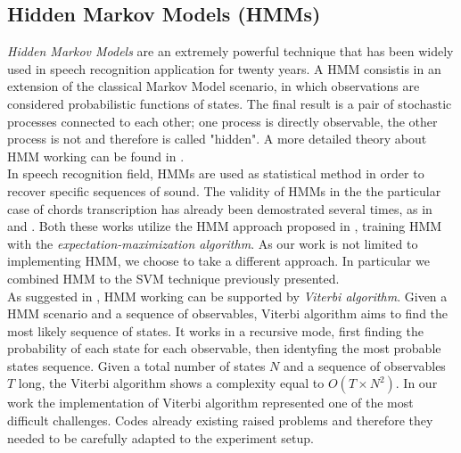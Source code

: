 \subsection{Hidden Markov Models (HMMs)}
\label{subsec:hmm}

\textit{Hidden Markov Models} are an extremely powerful technique that has been widely used in speech recognition application for twenty years. A HMM consistis in an extension of the classical Markov Model scenario, in which observations are considered probabilistic functions of states. The final result is a pair of stochastic processes connected to each other; one process is directly observable, the other process is not and therefore is called "hidden". A more detailed theory about HMM working can be found in \cite{LawrenceHMMtutorial}. \\
%
In speech recognition field, HMMs are used as statistical method in order to recover specific sequences of sound. The validity of HMMs in the the particular case of chords transcription has already been demostrated several times, as in \cite{AlexDanEMplusHMM} and \cite{belpickMusic}. Both these works utilize the HMM approach proposed in \cite{GoldMorganSpeechRecogn}, training HMM with the \textit{expectation-maximization algorithm}. As our work is not limited to implementing HMM, we choose to take a different approach. In particular we combined HMM to the SVM technique previously presented. \\
%
As suggested in \cite{GoldMorganSpeechRecogn}, HMM working can be supported by \textit{Viterbi algorithm}. Given a HMM scenario and a sequence of observables, Viterbi algorithm aims to find the most likely sequence of states. It works in a recursive mode, first finding the probability of each state for each observable, then identyfing the most probable states sequence. Given a total number of states $N$ and a sequence of observables $T$ long, the Viterbi algorithm shows a complexity equal to $O(T \times N^2)$. In our work the implementation of Viterbi algorithm represented one of the most difficult challenges. Codes already existing raised problems and therefore they needed to be carefully adapted to the experiment setup.
